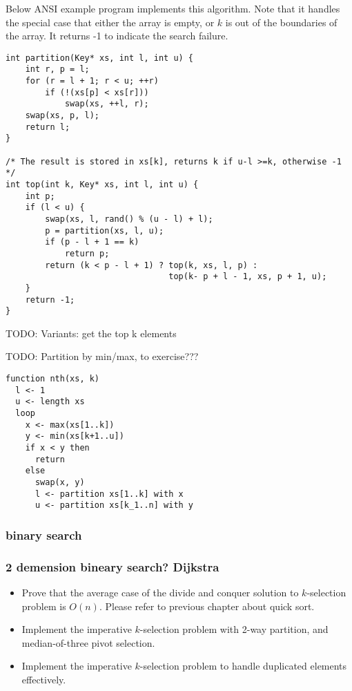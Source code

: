 \documentclass{article}
\begin{document}
Below ANSI example program implements this algorithm. Note that it handles the special case that
either the array is empty, or $k$ is out of the boundaries of the array. It returns -1 to indicate
the search failure.

\lstset{language=C}
\begin{lstlisting}
int partition(Key* xs, int l, int u) {
    int r, p = l;
    for (r = l + 1; r < u; ++r)
        if (!(xs[p] < xs[r]))
            swap(xs, ++l, r);
    swap(xs, p, l);
    return l;
}

/* The result is stored in xs[k], returns k if u-l >=k, otherwise -1 */
int top(int k, Key* xs, int l, int u) {
    int p;
    if (l < u) {
        swap(xs, l, rand() % (u - l) + l);
        p = partition(xs, l, u);
        if (p - l + 1 == k) 
            return p;
        return (k < p - l + 1) ? top(k, xs, l, p) : 
                                 top(k- p + l - 1, xs, p + 1, u);
    }
    return -1;
}
\end{lstlisting}

TODO: Variants: get the top k elements

TODO: Partition by min/max, to exercise???

\begin{verbatim}
function nth(xs, k)
  l <- 1
  u <- length xs
  loop
    x <- max(xs[1..k])
    y <- min(xs[k+1..u])
    if x < y then
      return
    else
      swap(x, y)
      l <- partition xs[1..k] with x
      u <- partition xs[k_1..n] with y 
\end{verbatim}

\subsubsection{binary search}

\subsubsection{2 demension bineary search? Dijkstra}

\begin{Exercise}
\begin{itemize}
\item Prove that the average case of the divide and conquer solution to $k$-selection problem is $O(n)$. Please refer to previous chapter about quick sort.
\item Implement the imperative $k$-selection problem with 2-way partition, and median-of-three pivot selection.
\item Implement the imperative $k$-selection problem to handle duplicated elements effectively.
\end{itemize}
\end{Exercise}
\end{document}
